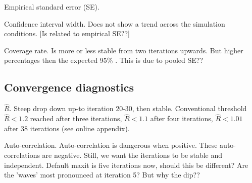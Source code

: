 \documentclass[article]{jss}
\begin{document}
Empirical standard error (SE).


Confidence interval width. Does not show a trend across the simulation conditions. [Is related to empirical SE??]


Coverage rate. Is more or less stable from two iterations upwards. But higher percentages then the expected 95\% \cite{neym43}. This is due to pooled SE??

\subsection{Convergence diagnostics}

$\widehat{R}$. Steep drop down up-to iteration 20-30, then stable. Conventional threshold $\widehat{R} < 1.2$ reached after three iterations, $\widehat{R} < 1.1$ after four iterations, $\widehat{R} < 1.01$ after 38 iterations (see online appendix). 

Auto-correlation. Auto-correlation is dangerous when positive. These auto-correlations are negative. Still, we want the iterations to be stable and independent. Default maxit is five iterations now, should this be different? Are the 'waves' most pronounced at iteration 5? But why the dip??  
\end{document}
